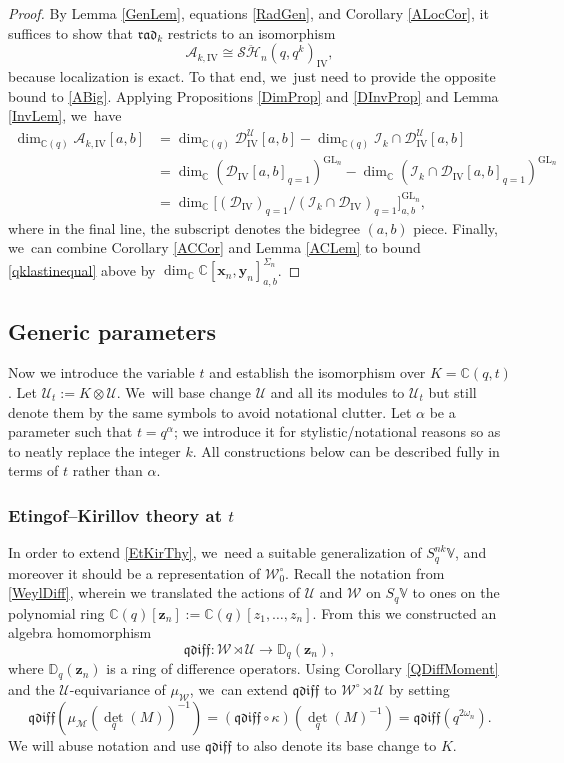 \documentclass[JEP,XML,SOM,Unicode,published]{cedram}
\newcommand{\GL}{\mathrm{GL}}
\theoremstyle{definition}
\newcommand{\CC}{\mathbb{C}}
\newcommand{\UU}{\mathcal{U}}
\newcommand{\DD}{\mathcal{D}}
\newcommand{\WW}{\mathcal{W}}
\newcommand{\AAA}{\mathcal{A}}
\newcommand{\WWo}{\WW^\circ}
\newcommand{\MM}{\mathcal{M}}
\newcommand{\SHH}{\mathcal{S}\ddot{\mathcal{H}}}
\begin{document}
\begin{proof}
By Lemma \ref{GenLem}, equations \eqref{RadGen}, and Corollary \ref{ALocCor}, it suffices to show that $\mathfrak{rad}_k$ restricts to an isomorphism
\[
\AAA_{k,\mathrm{IV}}\cong\SHH_n(q,q^k)_{\mathrm{IV}},
\]
because localization is exact.
To that end, we~just need to provide the opposite bound to \eqref{ABig}.
Applying Propositions \ref{DimProp} and \ref{DInvProp} and Lemma \ref{InvLem}, we~have
\begin{align}
\dim_{\CC(q)}\AAA_{k,\mathrm{IV}}[a,b]&=\dim_{\CC(q)}\DD_{\mathrm{IV}}^\UU[a,b]-\dim_{\CC(q)}\mathcal{I}_k\cap\DD_{\mathrm{IV}}^\UU[a,b]\nonumber\\
&= \dim_{\CC}\left(\DD_{\mathrm{IV}}[a,b]_{q=1} \right)^{\GL_n}-\dim_{\CC}\left(\mathcal{I}_k\cap\DD_{\mathrm{IV}}[a,b]_{q=1}\right)^{\GL_n}\nonumber\\
&= \dim_{\CC}\bigl[ \left(\DD_{\mathrm{IV}}\right)_{q=1}\big/(\mathcal{I}_k\cap\DD_{\mathrm{IV}})_{q=1} \bigr]^{\GL_n}_{a,b},\label{qklastinequal}
\end{align}
where in the final line, the subscript denotes the bidegree $(a,b)$ piece.
Finally, we~can combine Corollary \ref{ACCor} and Lemma \ref{ACLem} to bound \eqref{qklastinequal} above by $\dim_\CC\CC[\boldsymbol{x}_n,\boldsymbol{y}_n]_{a,b}^{\Sigma_n}$.
\end{proof}

\subsection{Generic parameters}\label{GenPar}
Now we introduce the variable $t$ and establish the isomorphism over $K=\CC(q,t)$.
Let $\UU_t:=K\otimes\UU$. We~will base change $\UU$ and all its modules to $\UU_t$ but still denote them by the same symbols to avoid notational clutter.
Let $\alpha$ be a parameter such that $t=q^\alpha$; we introduce it for stylistic/notational reasons so as to neatly replace the integer $k$.
All constructions below can be described fully in terms of $t$ rather than $\alpha$.

\subsubsection{Etingof--Kirillov theory at $t$}
In order to extend \ref{EtKirThy}, we~need a suitable generalization of $S_q^{nk}\mathbb{V}$, and moreover it should be a representation of $\WWo_0$.
Recall the notation from \ref{WeylDiff}, wherein we translated the actions of $\UU$ and $\WW$ on $S_q\mathbb{V}$ to ones on the polynomial ring $\CC(q)[\boldsymbol{z}_n]:=\CC(q)[z_1,\ldots,z_n]$.
From this we constructed an algebra homomorphism
\[
\mathfrak{qdiff}:\WW\rtimes\UU\to\mathbb{D}_q(\boldsymbol{z}_n),
\]
where $\mathbb{D}_q(\boldsymbol{z}_n)$ is a ring of difference operators.
Using Corollary \ref{QDiffMoment} and the $\UU$\nobreakdash-equi\-variance of $\mu_\WW$, we~can extend $\mathfrak{qdiff}$ to $\WWo\rtimes\UU$ by setting
\[
\mathfrak{qdiff}(\mu_\MM(\textstyle\det_q(M))^{-1})=(\mathfrak{qdiff}\circ\kappa)(\textstyle\det_q(M)^{-1})=\mathfrak{qdiff}(q^{2\omega_n}).
\]
We will abuse notation and use $\mathfrak{qdiff}$ to also denote its base change to $K$.
\end{document}
